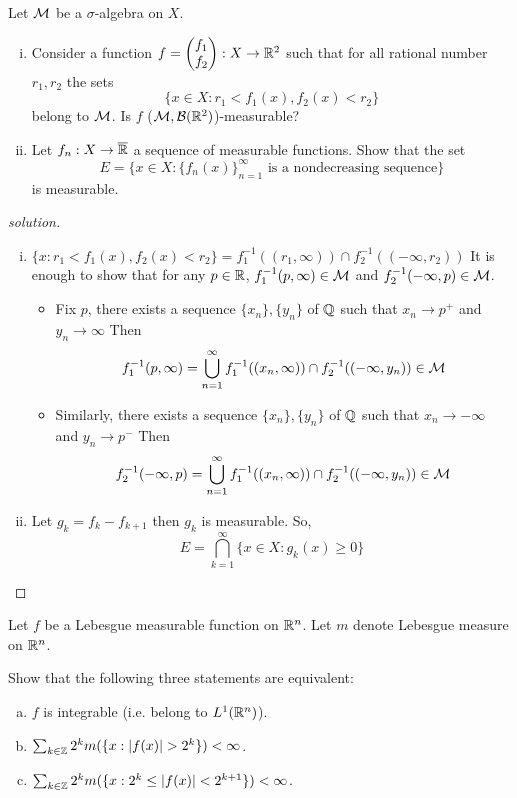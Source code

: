\begin{problem}
  Let $\mathcal M$ be a $\sigma$-algebra on $X$.
  \begin{enumerate}[(i)]
    \item Consider a function $f = \begin{pmatrix}
      f_1\\
      f_2
    \end{pmatrix} : X \to \mathbb R^2$ such that for all rational number $r_1, r_2$ the sets
    \[\{x \in X : r_1 < f_1(x), f_2(x) < r_2\}\]
    belong to $\mathcal M$. Is $f$ ($\mathcal M, \mathcal{B}(\mathbb R^2)$)-measurable?
    \item Let $f_n : X \to \overline{\mathbb R}$ a sequence of measurable functions. Show that the set
    \[E = \{x \in X : \{f_n(x)\}_{n=1}^\infty \text{ is a nondecreasing sequence}\}\]
    is measurable.
  \end{enumerate} 
\end{problem}

\begin{proof}[solution]
  \begin{enumerate}[(i)]
    \item $\{x : r_1 < f_1(x), f_2(x) < r_2\} = f_1^{-1}((r_1, \infty)) \cap f_2^{-1}((-\infty, r_2))$
    It is enough to show that for any $p \in \mathbb R$, $f_1^{-1}(p, \infty) \in \mathcal M$ and $f_2^{-1}(-\infty, p) \in \mathcal M$.
    \begin{itemize}
      \item Fix $p$, there exists a sequence $\{x_n\}, \{y_n\}$ of $\mathbb Q$ such that $x_n \to p^+$ and $y_n \to \infty$
      Then \[f_1^{-1}(p, \infty) = \bigcup_{n=1}^\infty f_1^{-1}((x_n, \infty)) \cap f_2^{-1}((-\infty, y_n)) \in \mathcal M\]
      \item Similarly, there exists a sequence $\{x_n\}, \{y_n\}$ of $\mathbb Q$ such that $x_n \to -\infty$ and $y_n \to p^-$ 
      Then \[f_2^{-1}(-\infty, p) = \bigcup_{n=1}^\infty f_1^{-1}((x_n, \infty)) \cap f_2^{-1}((-\infty, y_n)) \in \mathcal M\]
    \end{itemize}
    \item Let $g_k = f_k - f_{k+1}$ then $g_k$ is measurable. So,
    \[E = \bigcap_{k=1}^\infty \{x \in X : g_k(x) \ge 0 \}\]
  \end{enumerate}
\end{proof}

\begin{problem}
  Let $f$ be a Lebesgue measurable function on $\mathbb R^n$. Let $m$ denote Lebesgue measure on $\mathbb R^n$.

  Show that the following  three statements are equivalent:
  \begin{enumerate}[(a)]
    \item $f$ is integrable (i.e. belong to $L^1(\mathbb R^n)$).
    \item $\sum_{k \in \mathbb Z} 2^km(\{x : |f(x)| > 2^k\}) < \infty$.
    \item $\sum_{k \in \mathbb Z} 2^km(\{x : 2^k \le |f(x)| < 2^{k+1}\}) < \infty$.
  \end{enumerate}
\end{problem}

